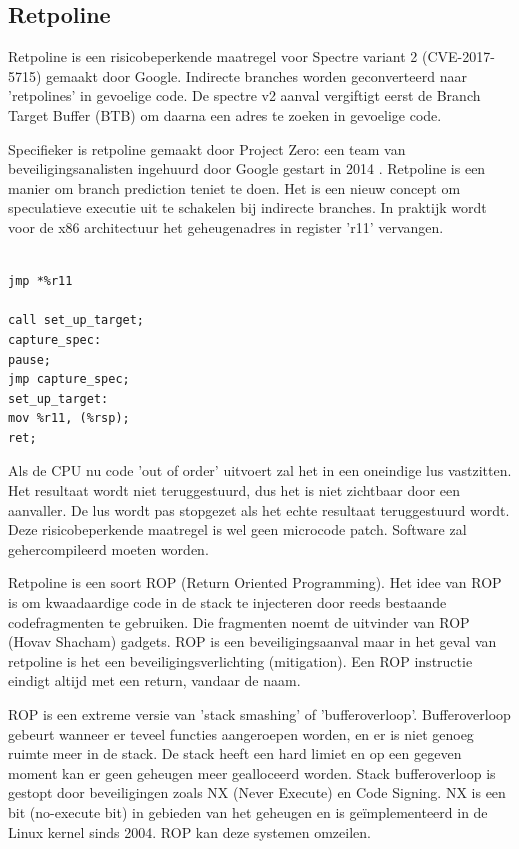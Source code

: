 \subsection{Retpoline}
Retpoline is een risicobeperkende maatregel voor Spectre variant 2 (CVE-2017-5715) gemaakt door Google.
Indirecte branches worden geconverteerd naar 'retpolines' in gevoelige code.
De spectre v2 aanval vergiftigt eerst de Branch Target Buffer (BTB) om daarna een adres te zoeken in gevoelige code.

Specifieker is retpoline gemaakt door Project Zero: een team van beveiligingsanalisten ingehuurd door Google gestart in 2014 \parencite{Evans2014}.
Retpoline is een manier om branch prediction teniet te doen.
Het is een nieuw concept om speculatieve executie uit te schakelen bij indirecte branches.
In praktijk wordt voor de x86 architectuur het geheugenadres in register 'r11' vervangen.


\begin{lstlisting}

jmp *%r11

call set_up_target;
capture_spec:         
pause;
jmp capture_spec;
set_up_target:
mov %r11, (%rsp);   
ret;    
\end{lstlisting}



\parencite{Turner2018}

Als de CPU nu code 'out of order' uitvoert zal het in een oneindige lus vastzitten. Het resultaat wordt niet teruggestuurd, dus het is niet zichtbaar door een aanvaller.
De lus wordt pas stopgezet als het echte resultaat teruggestuurd wordt.
Deze risicobeperkende maatregel is wel geen microcode patch. Software zal gehercompileerd moeten worden.

Retpoline is een soort ROP (Return Oriented Programming).\newline
Het idee van ROP  is om kwaadaardige code in de stack te injecteren door reeds bestaande codefragmenten te gebruiken.
Die fragmenten noemt de uitvinder van ROP (Hovav Shacham) gadgets. \parencite{Shacham2007}
ROP is een beveiligingsaanval maar in het geval van retpoline is het een beveiligingsverlichting (mitigation).
Een ROP instructie eindigt altijd met een return, vandaar de naam.


ROP is een extreme versie van 'stack smashing' of 'bufferoverloop'.
Bufferoverloop gebeurt wanneer er teveel functies aangeroepen worden, en er is niet genoeg ruimte meer in de stack. De stack heeft een hard limiet en op een gegeven moment kan er geen geheugen meer gealloceerd worden.
Stack bufferoverloop is gestopt door beveiligingen zoals NX (Never Execute) en Code Signing.
NX is een bit (no-execute bit) in gebieden van het geheugen en is geïmplementeerd in de Linux kernel sinds 2004.\parencite{KernelNewbies2004}
ROP kan deze systemen omzeilen.


